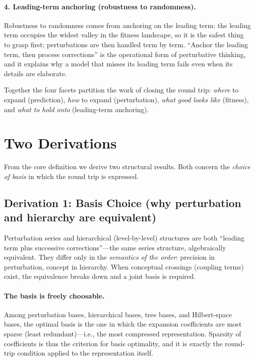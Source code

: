 \documentclass[11pt]{article}
\begin{document}
\paragraph{4. Leading-term anchoring (robustness to randomness).}
Robustness to randomness comes from anchoring on the leading term: the leading
term occupies the widest valley in the fitness landscape, so it is the safest
thing to grasp first; perturbations are then handled term by term. ``Anchor the
leading term, then process corrections'' is the operational form of
perturbative thinking, and it explains why a model that misses its leading term
fails even when its details are elaborate.

Together the four facets partition the work of closing the round trip:
\emph{where} to expand (prediction), \emph{how} to expand (perturbation),
\emph{what good looks like} (fitness), and \emph{what to hold onto}
(leading-term anchoring).
\section{Two Derivations}
\label{sec:derivations}

From the core definition we derive two structural results. Both concern the
\emph{choice of basis} in which the round trip is expressed.

\subsection{Derivation 1: Basis Choice (why perturbation and hierarchy are equivalent)}
\label{sec:basis}

Perturbation series and hierarchical (level-by-level) structures are both
``leading term plus successive corrections''---the same series structure,
algebraically equivalent. They differ only in the \emph{semantics of the order}:
precision in perturbation, concept in hierarchy. When conceptual crossings
(coupling terms) exist, the equivalence breaks down and a joint basis is
required.

\paragraph{The basis is freely choosable.}
Among perturbation bases, hierarchical bases, tree bases, and Hilbert-space
bases, the optimal basis is the one in which the expansion coefficients are most
sparse (least redundant)---i.e., the most compressed representation. Sparsity of
coefficients is thus the criterion for basis optimality, and it is exactly the
round-trip condition applied to the representation itself.
\end{document}
